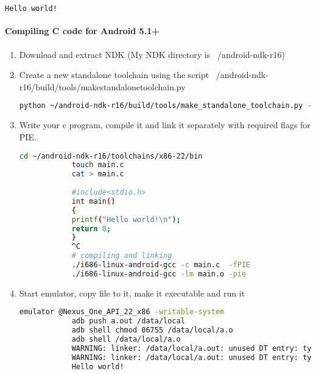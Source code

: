\documentclass[../main.tex]{subfile}
\begin{document}
\begin{appendices}
\begin{enumerate}
\begin{lstlisting}[language=bash]
			Hello world!
			\end{lstlisting}
		\end{enumerate}		


		\paragraph{Compiling C code for Android 5.1+}
		\begin{enumerate}
			\item Download and extract NDK (My NDK directory is ~/android-ndk-r16)
			\item Create a new standalone toolchain using the script ~/android-ndk-r16/build/tools/make\textunderscore standalone\textunderscore toolchain.py
			\begin{lstlisting}[language=bash]
			python ~/android-ndk-r16/build/tools/make_standalone_toolchain.py --arch x86 --api 22 --install-dir ~/android-ndk-r16/toolchains/x86-22
			\end{lstlisting}
			\item Write your c program, compile it and link it separately with required flags for PIE.
			\begin{lstlisting}[language=bash]
			cd ~/android-ndk-r16/toolchains/x86-22/bin
			touch main.c
			cat > main.c
			
			#include<stdio.h>
			int main()
			{
			printf("Hello world!\n");
			return 0;
			}
			^C
			# compiling and linking
			./i686-linux-android-gcc -c main.c  -fPIE
			./i686-linux-android-gcc -lm main.o -pie
			\end{lstlisting}
			\item Start emulator, copy file to it, make it executable and run it
			\begin{lstlisting}[language=bash]
			emulator @Nexus_One_API_22_x86 -writable-system
			adb push a.out /data/local
			adb shell chmod 06755 /data/local/a.o
			adb shell /data/local/a.o
			WARNING: linker: /data/local/a.out: unused DT entry: type 0x6ffffffe arg 0x32c
			WARNING: linker: /data/local/a.out: unused DT entry: type 0x6fffffff arg 0x1
			Hello world!
			\end{lstlisting}
		\end{enumerate}
	

\end{appendices}
\end{document}
